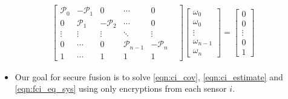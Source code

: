 \documentclass[letterpaper, 10 pt, conference]{ieeeconf}  %
\begin{document}
\begin{gather}
   \begin{bmatrix}
      \mathcal{P}_0 & -\mathcal{P}_1 & 0 & \cdots & 0 \\
      0 & \mathcal{P}_1 & -\mathcal{P}_2 & \cdots & 0 \\
      \vdots & \vdots & \vdots & \ddots & \vdots & \\
      0 & \cdots & 0 & \mathcal{P}_{n-1} & -\mathcal{P}_n \\
      1 & \cdots & 1 & 1 & 1 &
   \end{bmatrix}
   \begin{bmatrix}
      \omega_0 \\
      \omega_0 \\
      \vdots \\
      \omega_{n-1} \\
      \omega_n
   \end{bmatrix}
   =
   \begin{bmatrix}
      0 \\
      0 \\
      \vdots \\
      0 \\
      1
   \end{bmatrix} \label{eqn:fci_eq_sys}
\end{gather}
\begin{itemize}
   \item Our goal for secure fusion is to solve \eqref{eqn:ci_cov}, \eqref{eqn:ci_estimate} and \eqref{eqn:fci_eq_sys} using only encryptions from each sensor $i$.
\end{itemize}

\end{document}
